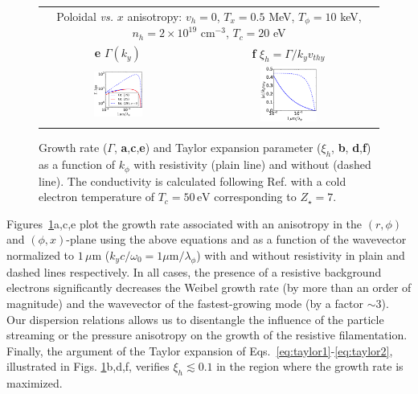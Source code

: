 \documentclass[aps,showpacs,superscriptaddress]{revtex4}
\begin{document}
\begin{figure}[ht]
{\begin{tabular}{cc}
\multicolumn{2}{c}{Poloidal \emph{vs.} $x$  anisotropy: $v_h = 0 $, $T_x=0.5$ MeV, $T_\phi = 10$ keV, $n_h = 2\times 10^{19}$ cm$^{-3}$, $T_{c}=20$ eV }\\
\textbf{e} $\Gamma(k_y)$&\textbf{f} $\xi_h= \Gamma/k_yv_{thy}$ \\
\includegraphics[width=0.33\textwidth]{gamma_ky_ordre3_r_phi_2.eps} 
 &\includegraphics[width=0.33\textwidth]{xi_ky_ordre3_r_phi_2.eps} 
\end{tabular}} 
\caption{\label{fig:gamma_ky} 
Growth rate ($\Gamma$, \textbf{a},\textbf{c},\textbf{e}) and Taylor expansion parameter ($\xi_h$, \textbf{b}, \textbf{d},\textbf{f}) as a function of $k_\phi$ with resistivity (plain line) and without (dashed line).
The conductivity is calculated following Ref.  \cite[]{POP_Perez_2012} with a cold electron temperature of $T_c = 50\,\mathrm{eV}$ corresponding to $Z_\star = 7$. 
}
\end{figure}

Figures~\ref{fig:gamma_ky}a,c,e plot the growth rate associated with an anisotropy in the $(r, \phi)$ and $(\phi,x)$-plane using the above equations and as a function of the wavevector normalized to $1\, \mu$m ($k_yc/\omega_0 = 1\mu\mathrm{m}/\lambda_\phi$) with and without resistivity in plain and dashed lines respectively. 
In all cases, the presence of a resistive background electrons significantly decreases the Weibel growth rate (by more than an order of magnitude) and the wavevector of the fastest-growing mode (by a factor $\sim 3$). 
Our dispersion relations allows us to disentangle the influence of the particle streaming or the pressure anisotropy on the growth of the resistive filamentation. 
Finally, the argument of the Taylor expansion of Eqs.~\eqref{eq:taylor1}-\eqref{eq:taylor2}, illustrated in Figs. \ref{fig:gamma_ky}b,d,f,
verifies $\xi_h \lesssim 0.1$ in the region where the growth rate is maximized.
\end{document}
